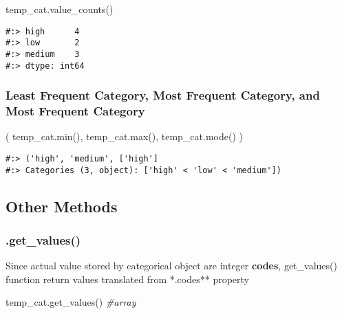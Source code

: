 \documentclass[
]{book}
\newenvironment{Shaded}{\begin{snugshade}}{\end{snugshade}}
\newcommand{\BuiltInTok}[1]{#1}
\newcommand{\CommentTok}[1]{\textcolor[rgb]{0.37,0.37,0.37}{\textit{#1}}}
\newcommand{\NormalTok}[1]{#1}
\begin{document}
\begin{Shaded}
\begin{Highlighting}[]
\NormalTok{temp\_cat.value\_counts()}
\end{Highlighting}
\end{Shaded}

\begin{verbatim}
#:> high      4
#:> low       2
#:> medium    3
#:> dtype: int64
\end{verbatim}

\hypertarget{least-frequent-category-most-frequent-category-and-most-frequent-category}{%
\subsubsection{Least Frequent Category, Most Frequent Category, and Most Frequent Category}\label{least-frequent-category-most-frequent-category-and-most-frequent-category}}

\begin{Shaded}
\begin{Highlighting}[]
\NormalTok{( temp\_cat.}\BuiltInTok{min}\NormalTok{(), temp\_cat.}\BuiltInTok{max}\NormalTok{(), temp\_cat.mode() )}
\end{Highlighting}
\end{Shaded}

\begin{verbatim}
#:> ('high', 'medium', ['high']
#:> Categories (3, object): ['high' < 'low' < 'medium'])
\end{verbatim}

\hypertarget{other-methods-1}{%
\subsection{Other Methods}\label{other-methods-1}}

\hypertarget{get_values}{%
\subsubsection{.get\_values()}\label{get_values}}

Since actual value stored by categorical object are integer \textbf{codes}, get\_values() function return values translated from *.codes** property

\begin{Shaded}
\begin{Highlighting}[]
\NormalTok{temp\_cat.get\_values()  }\CommentTok{\#array}
\end{Highlighting}
\end{Shaded}
\end{document}
